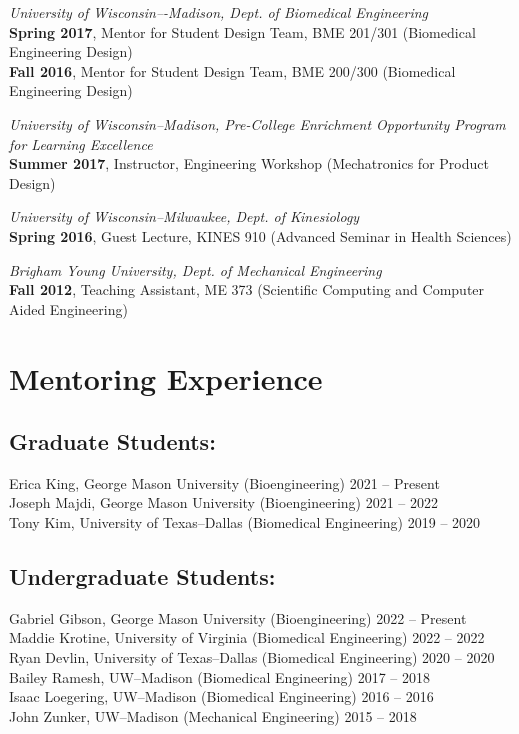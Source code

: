 \documentclass[letterpaper, 10pt]{article}
\begin{document}
\bigskip

\textit{University of Wisconsin–-Madison, Dept. of Biomedical Engineering}\\
\textbf{Spring 2017}, Mentor for Student Design Team, BME 201/301 (Biomedical Engineering Design)\\
\textbf{Fall 2016}, Mentor for Student Design Team, BME 200/300 (Biomedical Engineering Design)

\bigskip

\textit{University of Wisconsin--Madison, Pre-College Enrichment Opportunity Program for Learning Excellence}\\
\textbf{Summer 2017}, Instructor, Engineering Workshop (Mechatronics for Product Design)

\bigskip

\textit{University of Wisconsin--Milwaukee, Dept. of Kinesiology}\\
\textbf{Spring 2016}, Guest Lecture, KINES 910 (Advanced Seminar in Health Sciences)

\bigskip

\textit{Brigham Young University, Dept. of Mechanical Engineering}\\
\textbf{Fall 2012}, Teaching Assistant, ME 373 (Scientiﬁc Computing and Computer Aided Engineering)


\section{Mentoring Experience}
\subsection{Graduate Students:}
Erica King, George Mason University (Bioengineering) \hfill 2021 -- Present\\
Joseph Majdi, George Mason University (Bioengineering) \hfill 2021 -- 2022\\
Tony Kim, University of Texas--Dallas (Biomedical Engineering) \hfill 2019 -- 2020

\subsection{Undergraduate Students:}
Gabriel Gibson, George Mason University (Bioengineering) \hfill 2022 -- Present\\
Maddie Krotine, University of Virginia (Biomedical Engineering) \hfill 2022 -- 2022\\
Ryan Devlin, University of Texas--Dallas (Biomedical Engineering) \hfill 2020 -- 2020\\
Bailey Ramesh, UW--Madison (Biomedical Engineering) \hfill 2017 -- 2018\\
Isaac Loegering, UW--Madison (Biomedical Engineering) \hfill 2016 -- 2016\\
John Zunker, UW--Madison (Mechanical Engineering) \hfill 2015 -- 2018
\end{document}

